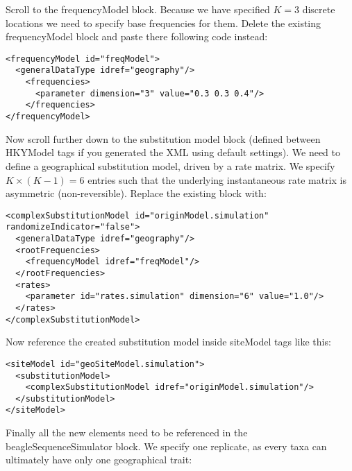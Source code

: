 \medskip{}

Scroll to the {\color{darkblue}\mbox{frequencyModel}} block. Because we have specified $K=3$ discrete locations we need to specify base frequencies for them. Delete the existing {\color{darkblue}\mbox{frequencyModel}} block and paste there following code instead:

\medskip{}

\begin{lstlisting}
<frequencyModel id="freqModel">
  <generalDataType idref="geography"/>
    <frequencies>
      <parameter dimension="3" value="0.3 0.3 0.4"/>
    </frequencies>
</frequencyModel>
\end{lstlisting}

\medskip{}

Now scroll further down to the substitution model block (defined between {\color{darkblue}\mbox{HKYModel}} tags if you generated the XML using default settings). 
We need to define a geographical substitution model, driven by a rate matrix. 
We specify $K\times(K-1)=6$ entries such that the underlying instantaneous rate matrix is asymmetric (non-reversible). 
Replace the existing block with: 

\medskip{}

\begin{lstlisting}
<complexSubstitutionModel id="originModel.simulation" randomizeIndicator="false">
  <generalDataType idref="geography"/>
  <rootFrequencies>
    <frequencyModel idref="freqModel"/>
  </rootFrequencies>
  <rates>
    <parameter id="rates.simulation" dimension="6" value="1.0"/>
  </rates>
</complexSubstitutionModel>
\end{lstlisting}

\medskip{}

Now reference the created substitution model inside {\color{darkblue}\mbox{siteModel}} tags like this:

\medskip{}

\begin{lstlisting}
<siteModel id="geoSiteModel.simulation">
  <substitutionModel>
    <complexSubstitutionModel idref="originModel.simulation"/>
  </substitutionModel>
</siteModel>
\end{lstlisting}

\medskip{}

Finally all the new elements need to be referenced in the {\color{darkblue}\mbox{beagleSequenceSimulator}} block. We specify one replicate, as every taxa can ultimately have only one geographical trait:

